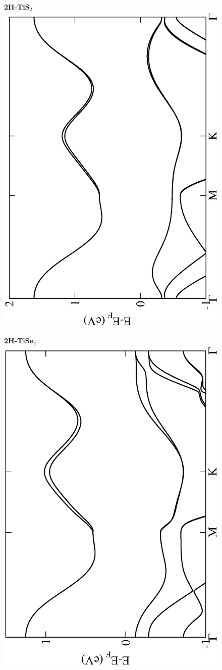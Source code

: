 \begin{figure}[htbp]
  \centering
  {\bfseries \sffamily 2H-TiS$_{2}$}\\
  \includegraphics[width=0.45\linewidth, angle=-90, trim={3cm, 0cm, 2cm, 0cm}, clip]{img/SI_figs/BS/2H-TiS2.eps}
\end{figure}

\begin{figure}[htbp]
  \centering
  {\bfseries \sffamily 2H-TiSe$_{2}$}\\
  \includegraphics[width=0.45\linewidth, angle=-90, trim={3cm, 0cm, 2cm, 0cm}, clip]{img/SI_figs/BS/2H-TiSe2.eps}
\end{figure}


